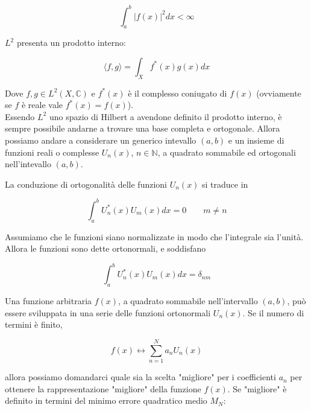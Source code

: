 \begin{equation*}
    \int_a ^b |f(x)|^2 dx < \infty
\end{equation*}

$L^2$ presenta un prodotto interno: 

\begin{tcolorbox}[colback=yellow!10!white, colframe=orange!70!black, boxrule=0.8pt]
\begin{equation}
    \langle f, g \rangle = \int_{X} f^* (x) g(x) dx
\end{equation}
\end{tcolorbox}

Dove $f,g \in L^2(X,\mathbb{C})$ e $f^* (x)$ è il complesso coniugato di $f(x)$ (ovviamente se $f$ è reale vale $f^*(x) = f(x)$). \\

Essendo $L^2$ uno spazio di Hilbert a avendone definito il prodotto interno, è sempre possibile andarne a trovare una base completa e ortogonale. Allora possiamo andare a considerare un generico intevallo $(a,b)$ e un insieme di funzioni reali o complesse $U_n(x)$, $n \in \mathbb{N}$, a quadrato sommabile ed ortogonali nell'intevallo $(a,b)$. \\

\newpage

La conduzione di ortogonalità delle funzioni $U_n (x)$ si traduce in 

\begin{equation}
    \int_a ^b U_n ^*(x)U_m(x) dx = 0 \qquad m \neq n
\end{equation}

Assumiamo che le funzioni siano normalizzate in modo che l'integrale sia l'unità. Allora le funzioni sono dette ortonormali, e soddisfano

\begin{equation}
    \int_a ^b U_n ^*(x)U_m(x) dx = \delta_{nm}
\end{equation}

Una funzione arbitraria $f(x)$, a quadrato sommabile nell'intervallo $(a,b)$, può essere sviluppata in una serie delle funzioni ortonormali $U_n(x)$. Se il numero di termini è finito,

\begin{equation*}
    f(x) \leftrightarrow \sum_{n = 1}^N a_n U_n(x)
\end{equation*}

allora possiamo domandarci quale sia la scelta "migliore" per i coefficienti $a_n$ per ottenere la rappresentazione "migliore" della funzione $f(x)$. Se "migliore" è definito in termini del minimo errore quadratico medio $M_N$:

